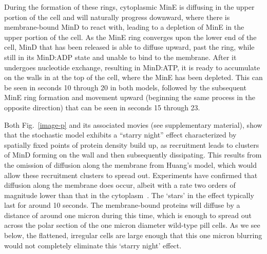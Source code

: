 \documentclass[10pt,letterpaper]{article}
\newcommand{\fixme}[1]{\red{[#1]}}
\newcommand{\red}[1]{{\bf \color{red} #1}}
\begin{document}
During the formation of these rings, cytoplasmic MinE is diffusing in
the upper portion of the cell and will naturally progress downward,
where there is membrane-bound MinD to react with, leading to a
depletion of MinE in the upper portion of the cell.  As the MinE ring
converges upon the lower end of the cell, MinD that has been released
is able to diffuse upward, past the ring, while still in its MinD:ADP
state and unable to bind to the membrane.  After it undergoes
nucleotide exchange, resulting in MinD:ATP, it is ready to accumulate
on the walls in at the top of the cell, where the MinE has been
depleted.  This can be seen in seconds 10 through 20 in both models,
followed by the subsequent MinE ring formation and movement upward
(beginning the same process in the opposite direction) that can be
seen in seconds 15 through 23.

Both Fig.~\ref{image-p} and its associated movies (see supplementary
material), show that the stochastic model exhibits a ``starry night''
effect characterized by spatially fixed points of protein density
build up, as recruitment leads to clusters of MinD forming on the wall
and then subsequently dissipating.  This results from the omission of
diffusion along the membrane from Huang's model, which would allow
these recruitment clusters to spread out.  Experiments have confirmed
that diffusion along the membrane does occur, albeit with a rate two
orders of magnitude lower than that in the
cytoplasm~\cite{meacci2005min}.  The `stars' in the effect typically
last for around 10 seconds. The membrane-bound proteins will diffuse
by a distance of around one micron during this time, which is enough
to spread out across the polar section of the one micron diameter
wild-type pill cells.  As we see below, the flattened, irregular cells
are large enough that this one micron blurring would not completely
eliminate this `starry night' effect.

\end{document}
